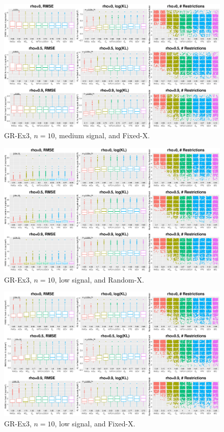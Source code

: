 \begin{figure}[!ht]
\centering
\includegraphics[width=\textwidth]{figures/supplement/fixedx_GR-Ex3_n10_msnr.eps}
\caption{GR-Ex3, $n=10$, medium signal, and Fixed-X.}
\end{figure}
\clearpage
\begin{figure}[!ht]
\centering
\includegraphics[width=\textwidth]{figures/supplement/randomx_GR-Ex3_n10_lsnr.eps}
\caption{GR-Ex3, $n=10$, low signal, and Random-X.}
\end{figure}
\begin{figure}[!ht]
\centering
\includegraphics[width=\textwidth]{figures/supplement/fixedx_GR-Ex3_n10_lsnr.eps}
\caption{GR-Ex3, $n=10$, low signal, and Fixed-X.}
\end{figure}
